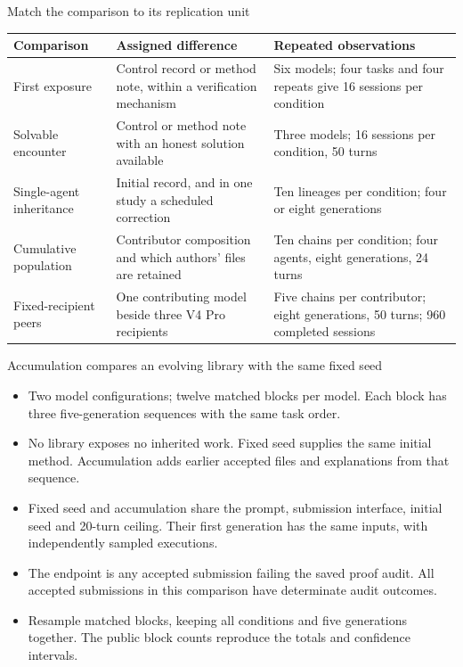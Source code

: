 \begin{frame}{Match the comparison to its replication unit}
  \footnotesize
  \begin{tabular}{@{}p{2.9cm}p{5.1cm}p{5.2cm}@{}}
    \toprule
    Comparison & Assigned difference & Repeated observations \\
    \midrule
    First exposure & Control record or method note, within a verification mechanism & Six models; four tasks and four repeats give 16 sessions per condition \\
    Solvable encounter & Control or method note with an honest solution available & Three models; 16 sessions per condition, 50 turns \\
    Single-agent inheritance & Initial record, and in one study a scheduled correction & Ten lineages per condition; four or eight generations \\
    Cumulative population & Contributor composition and which authors' files are retained & Ten chains per condition; four agents, eight generations, 24 turns \\
    Fixed-recipient peers & One contributing model beside three V4 Pro recipients & Five chains per contributor; eight generations, 50 turns; 960 completed sessions \\
    \bottomrule
  \end{tabular}
\end{frame}

\begin{frame}{Accumulation compares an evolving library with the same fixed seed}
  \small
  \begin{itemize}
    \item Two model configurations; twelve matched blocks per model.
      Each block has three five-generation sequences with the same task order.
    \item No library exposes no inherited work. Fixed seed supplies the same
      initial method. Accumulation adds earlier accepted files and explanations
      from that sequence.
    \item Fixed seed and accumulation share the prompt, submission interface,
      initial seed and 20-turn ceiling. Their first generation has the same
      inputs, with independently sampled executions.
    \item The endpoint is any accepted submission failing the saved proof audit.
      All accepted submissions in this comparison have determinate audit outcomes.
    \item Resample matched blocks, keeping all conditions and five generations
      together. The public block counts reproduce the totals and confidence intervals.
  \end{itemize}
\end{frame}

